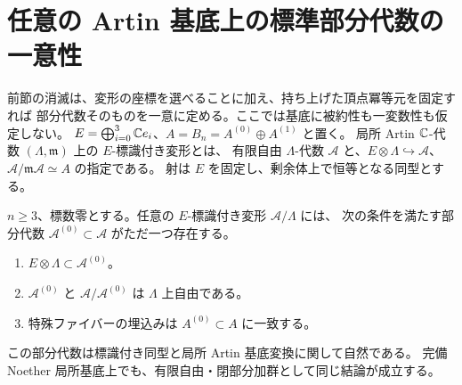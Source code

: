 \section{任意の Artin 基底上の標準部分代数の一意性}
\label{sec:canonical}

前節の消滅は、変形の座標を選べることに加え、持ち上げた頂点冪等元を固定すれば
部分代数そのものを一意に定める。ここでは基底に被約性も一変数性も仮定しない。
$E=\bigoplus_{i=0}^3\mathbb C e_i$、$A=B_n=A^{(0)}\oplus A^{(1)}$ と置く。
局所 Artin $\mathbb C$-代数 $(\Lambda,\mathfrak m)$ 上の $E$-標識付き変形とは、
有限自由 $\Lambda$-代数 $\mathcal A$ と、$E\otimes\Lambda\hookrightarrow\mathcal A$、
$\mathcal A/\mathfrak m\mathcal A\simeq A$ の指定である。
射は $E$ を固定し、剰余体上で恒等となる同型とする。

\begin{theorem}[標準部分代数の一意持上げ]
\label{thm:canonical-subalgebra}
$n\ge3$、標数零とする。任意の $E$-標識付き変形 $\mathcal A/\Lambda$ には、
次の条件を満たす部分代数 $\mathcal A^{(0)}\subset\mathcal A$ がただ一つ存在する。
\begin{enumerate}[label=\textup{(\roman*)}]
\item $E\otimes\Lambda\subset\mathcal A^{(0)}$。
\item $\mathcal A^{(0)}$ と $\mathcal A/\mathcal A^{(0)}$ は $\Lambda$ 上自由である。
\item 特殊ファイバーの埋込みは $A^{(0)}\subset A$ に一致する。
\end{enumerate}
この部分代数は標識付き同型と局所 Artin 基底変換に関して自然である。
完備 Noether 局所基底上でも、有限自由・閉部分加群として同じ結論が成立する。
\end{theorem}

